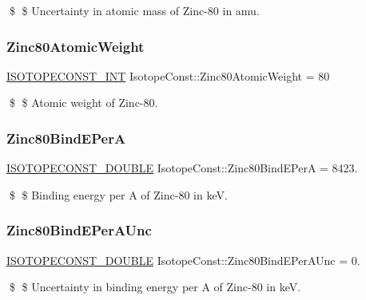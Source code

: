 \$ \$ Uncertainty in atomic mass of Zinc-\/80 in amu. \mbox{\label{group___isotope_const-_zinc-_zn80_ga2d2f992c02b2c7ebdfcaf3fe80ec21f6}} 
\subsubsection{\texorpdfstring{Zinc80\+Atomic\+Weight}{Zinc80AtomicWeight}}
{\footnotesize\ttfamily \mbox{\hyperlink{group___isotope_const-_macros_ga5f18360b3e99483a35c32d789e62621c}{I\+S\+O\+T\+O\+P\+E\+C\+O\+N\+S\+T\+\_\+\+I\+NT}} Isotope\+Const\+::\+Zinc80\+Atomic\+Weight = 80}

\$ \$ Atomic weight of Zinc-\/80. \mbox{\label{group___isotope_const-_zinc-_zn80_ga93c16aca1bafe5300e5943765a30fef5}} 
\subsubsection{\texorpdfstring{Zinc80\+Bind\+E\+PerA}{Zinc80BindEPerA}}
{\footnotesize\ttfamily \mbox{\hyperlink{group___isotope_const-_macros_ga8f45a7272ce02c0b4c65c44636ed719a}{I\+S\+O\+T\+O\+P\+E\+C\+O\+N\+S\+T\+\_\+\+D\+O\+U\+B\+LE}} Isotope\+Const\+::\+Zinc80\+Bind\+E\+PerA = 8423.}

\$ \$ Binding energy per A of Zinc-\/80 in keV. \mbox{\label{group___isotope_const-_zinc-_zn80_gab5f0574a68d3d2e986b8b88ef83f5117}} 
\subsubsection{\texorpdfstring{Zinc80\+Bind\+E\+Per\+A\+Unc}{Zinc80BindEPerAUnc}}
{\footnotesize\ttfamily \mbox{\hyperlink{group___isotope_const-_macros_ga8f45a7272ce02c0b4c65c44636ed719a}{I\+S\+O\+T\+O\+P\+E\+C\+O\+N\+S\+T\+\_\+\+D\+O\+U\+B\+LE}} Isotope\+Const\+::\+Zinc80\+Bind\+E\+Per\+A\+Unc = 0.}

\$ \$ Uncertainty in binding energy per A of Zinc-\/80 in keV. \mbox{\label{group___isotope_const-_zinc-_zn80_gaaa7361ae238e6d7082208a78fe46e8bc}} 
